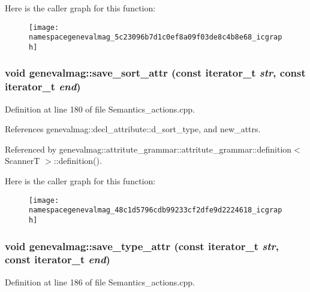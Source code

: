 Here is the caller graph for this function:\nopagebreak
\begin{figure}[H]
\begin{center}
\leavevmode
\texttt{[image: namespacegenevalmag\_5c23096b7d1c0ef8a09f03de8c4b8e68\_icgraph]}
\end{center}
\end{figure}
\hypertarget{namespacegenevalmag_48c1d5796cdb99233cf2dfe9d2224618}{
\subsubsection[{save\_\-sort\_\-attr}]{\setlength{\rightskip}{0pt plus 5cm}void genevalmag::save\_\-sort\_\-attr (const iterator\_\-t {\em str}, \/  const iterator\_\-t {\em end})}}
\label{namespacegenevalmag_48c1d5796cdb99233cf2dfe9d2224618}




Definition at line 180 of file Semantics\_\-actions.cpp.

References genevalmag::decl\_\-attribute::d\_\-sort\_\-type, and new\_\-attrs.

Referenced by genevalmag::attritute\_\-grammar::attritute\_\-grammar::definition$<$ ScannerT $>$::definition().

Here is the caller graph for this function:\nopagebreak
\begin{figure}[H]
\begin{center}
\leavevmode
\texttt{[image: namespacegenevalmag\_48c1d5796cdb99233cf2dfe9d2224618\_icgraph]}
\end{center}
\end{figure}
\hypertarget{namespacegenevalmag_9669d56acdb87bd7130c7da9d810b53a}{
\subsubsection[{save\_\-type\_\-attr}]{\setlength{\rightskip}{0pt plus 5cm}void genevalmag::save\_\-type\_\-attr (const iterator\_\-t {\em str}, \/  const iterator\_\-t {\em end})}}
\label{namespacegenevalmag_9669d56acdb87bd7130c7da9d810b53a}




Definition at line 186 of file Semantics\_\-actions.cpp.

